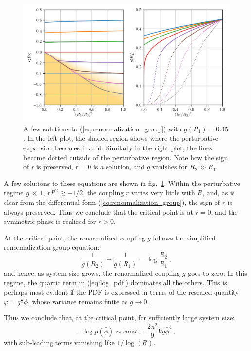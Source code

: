 \documentclass[11pt,a4paper]{article}
\begin{document}
\begin{figure}
\begin{center}
\includegraphics[scale=0.75]{renormalization_group.png}
\end{center}
    \caption{\label{fig:renormalization_group} A few solutions to
    (\ref{eq:renormalization_group}) with $g(R_1) = 0.45$.  In the left plot,
    the shaded region shows where the perturbative expansion becomes invalid.
    Similarly in the right plot, the lines become dotted outside of the
    perturbative region. Note how the sign of $r$ is preserved, $r = 0$ is a
    solution, and $g$ vanishes for $R_2 \gg R_1$.}
\end{figure}

A few solutions to these equations are shown in
fig.~\ref{fig:renormalization_group}. Within the perturbative regime $g \ll 1$,
$r R^2 \gtrsim -1/2$, the coupling $r$ varies very little with $R$, and, as is
clear from the differential form (\ref{eq:renormalization_group}), the sign of
$r$ is always preserved. Thus we conclude that the critical point is at $r
= 0$, and the symmetric phase is realized for $r > 0$.

At the critical point, the renormalized coupling $g$ follows the simplified renormalization group equation:
\begin{equation}
    \frac{1}{g(R_2)} - \frac{1}{g(R_1)} = \log\frac{R_2}{R_1}\,,
\end{equation}
and hence, as system size grows, the renormalized coupling $g$ goes to zero.
In this regime, the quartic term in (\ref{eq:log_pdf}) dominates all the
others. This is perhaps most evident if the PDF is expressed in terms of the
rescaled quantity $\bar{\varphi} = g^{\frac{1}{4}} \bar{\phi}$, whose
variance remains finite as $g\to0$.

Thus we conclude that, at the critical point, for sufficiently large system
size:
\begin{equation}
    \label{eq:log_pdf_critical_point}
    -\log p(\bar{\phi}) \sim \mathrm{const} + \frac{2\pi^2}{9} V g\bar{\phi}^4\,,
\end{equation}
with sub-leading terms vanishing like $1 / \log(R)$.
\end{document}
